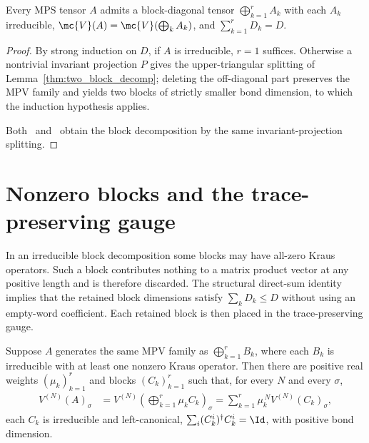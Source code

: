 \begin{lemma}\label{thm:irred_decomp}
    \leanok
    Every MPS tensor $A$ admits a block-diagonal tensor
    $\bigoplus_{k=1}^r A_k$ with each $A_k$ irreducible,
    $\mc{V}(A)=\mc{V}(\bigoplus_k A_k)$, and
    $\sum_{k=1}^rD_k=D$.
\end{lemma}

\begin{proof}
    \leanok
    By strong induction on $D$, if $A$ is irreducible, $r=1$ suffices. Otherwise a
    nontrivial invariant projection $P$ gives the upper-triangular splitting of
    Lemma~\ref{thm:two_block_decomp}; deleting the off-diagonal part preserves
    the MPV family and yields two blocks of strictly smaller bond dimension, to
    which the induction hypothesis applies.

    Both~\cite[Theorem~4]{PerezGarcia2007Matrix}
    and~\cite[Section~IV.A.1]{Cirac2021Matrix} obtain the block decomposition by
    the same invariant-projection splitting.
\end{proof}

\section{Nonzero blocks and the trace-preserving gauge}%
\label{sec:nonzero_blocks_tp_gauge}

In an irreducible block decomposition some blocks may have all-zero Kraus
operators. Such a block contributes nothing to a matrix product vector at any
positive length and is therefore discarded. The structural direct-sum identity
implies that the retained block dimensions satisfy $\sum_kD_k\le D$ without
using an empty-word coefficient. Each retained block is then placed in the
trace-preserving gauge.


\begin{lemma}%
    \label{thm:blockwise_tp_gauge}
    \leanok
    Suppose $A$ generates the same MPV family as
    $\bigoplus_{k=1}^rB_k$, where each $B_k$ is irreducible with at least one
    nonzero Kraus operator. Then there are positive real weights
    $(\mu_k)_{k=1}^r$ and blocks $(C_k)_{k=1}^r$ such that, for every $N$ and
    every $\sigma$,
    \begin{align}
        V^{(N)}(A)_\sigma
         & =
        V^{(N)}\!\left(\bigoplus_{k=1}^r\mu_kC_k\right)_\sigma
        =
        \sum_{k=1}^r\mu_k^{\,N}V^{(N)}(C_k)_\sigma,
        \label{eq:canonical_blockwise_tp}
    \end{align}
    each $C_k$ is irreducible and left-canonical,
    $\sum_i(C_k^i)^\dagger C_k^i=\Id$, with positive bond dimension.
\end{lemma}

